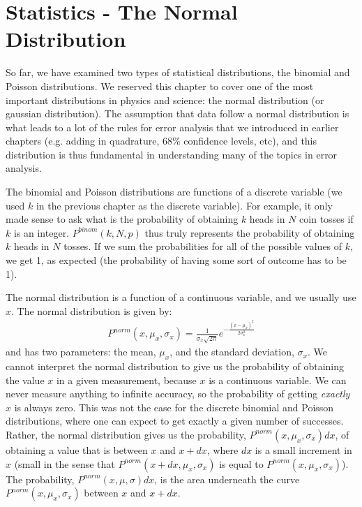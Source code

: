 \chapter{Statistics - The Normal Distribution}
So far, we have examined two types of statistical distributions, the binomial and Poisson distributions. We reserved this chapter to cover one of the most important distributions in physics and science: the normal distribution (or gaussian distribution). The assumption that data follow a normal distribution is what leads to a lot of the rules for error analysis that we introduced in earlier chapters (e.g. adding in quadrature, 68\% confidence levels, etc), and this distribution is thus fundamental in understanding many of the topics in error analysis.

The binomial and Poisson distributions are functions of a discrete variable (we used $k$ in the previous chapter as the discrete variable). For example, it only made sense to ask what is the probability of obtaining $k$ heads in $N$ coin tosses if $k$ is an integer. $P^{binom}(k,N,p)$ thus truly represents the probability of obtaining $k$ heads in $N$ tosses. If we sum the probabilities for all of the possible values of $k$, we get 1, as expected (the probability of having some sort of outcome has to be 1). 

The normal distribution is a function of a continuous variable, and we usually use $x$. The normal distribution is given by:
\begin{align}
\label{eqn:gaus}
P^{norm}(x,\mu_x,\sigma_x)=\frac{1}{\sigma_x\sqrt{2\pi}}e^{-\frac{(x-\mu_x)^2}{2\sigma_x^2}}
\end{align}
and has two parameters: the mean, $\mu_x$, and the standard deviation, $\sigma_x$. We cannot interpret the normal distribution to give us the probability of obtaining the value $x$ in a given measurement, because $x$ is a continuous variable. We can never measure anything to infinite accuracy, so the probability of getting \textit{exactly} $x$ is always zero. This was not the case for the discrete binomial and Poisson distributions, where one can expect to get exactly a given number of successes. Rather, the normal distribution gives us the probability, $P^{norm}(x,\mu_x,\sigma_x)dx$, of obtaining a value that is between $x$ and $x+dx$, where $dx$ is a small increment in $x$ (small in the sense that $P^{norm}(x+dx,\mu_x,\sigma_x)$ is equal to $P^{norm}(x,\mu_x,\sigma_x)$). The probability, $P^{norm}(x,\mu,\sigma)dx$, is the area underneath the curve $P^{norm}(x,\mu_x,\sigma_x)$ between $x$ and $x+dx$. 

